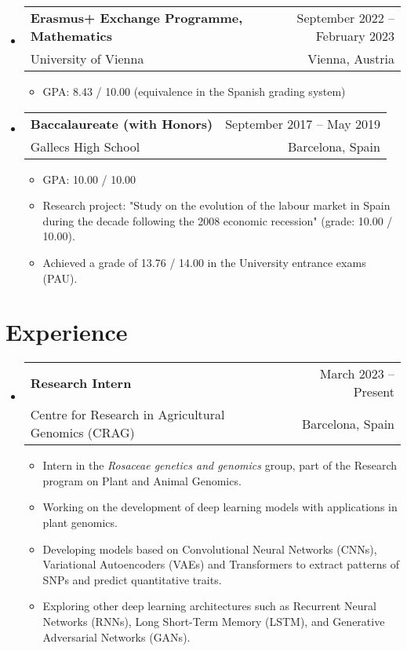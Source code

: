 \documentclass[a4paper,11pt]{article}
\makeatletter
\newcommand{\resumeQuadHeading}[4]{
  \item
  \begin{tabular*}{0.96\textwidth}[t]{l@{\extracolsep{\fill}}r}
    \textbf{#1} & \small #2 \\
    \small#3 & \small #4 \\
  \end{tabular*}
}
\newcommand{\resumeHeadingListStart}{
  \begin{itemize}[leftmargin=0.15in, label={}]
}
\newcommand{\resumeHeadingListEnd}{\end{itemize}}
\makeatother
\begin{document}
  \resumeHeadingListStart{}
    \resumeQuadHeading{Erasmus+ Exchange Programme, Mathematics}{September 2022 – February 2023}
    {University of Vienna}{Vienna, Austria}
    \begin{itemize}[leftmargin=3em, itemsep=0.1em, topsep=2pt]
        \item \small GPA: 8.43 / 10.00 (equivalence in the Spanish grading system)
    \end{itemize}
  \resumeHeadingListEnd{}
  
  \resumeHeadingListStart{}
    \resumeQuadHeading{Baccalaureate (with Honors)}{September 2017 – May 2019}
    {Gallecs High School}{Barcelona, Spain}
    \begin{itemize}[leftmargin=3em, itemsep=0.1em, topsep=2pt]
      \item \small GPA: 10.00 / 10.00
      \item \small Research project: "Study on the evolution of the labour market in Spain during the decade following the 2008 economic recession" (grade: 10.00 / 10.00).
      \item \small Achieved a grade of 13.76 / 14.00 in the University entrance exams (PAU).
    \end{itemize}
  \resumeHeadingListEnd{}


\section{Experience}
  \resumeHeadingListStart{}
    \resumeQuadHeading{Research Intern}{March 2023 – Present}
    {Centre for Research in Agricultural Genomics (CRAG)}{Barcelona, Spain}
    \begin{itemize}[leftmargin=3em, itemsep=0.1em, topsep=2pt]
      \item \small Intern in the \textit{Rosaceae genetics and genomics} group, part of the Research program on Plant and Animal Genomics.
      \item \small Working on the development of deep learning models with applications in plant genomics. 
      \item \small Developing models based on Convolutional Neural Networks (CNNs), Variational Autoencoders (VAEs) and Transformers to extract patterns of SNPs and predict quantitative traits. 
      \item \small Exploring other deep learning architectures such as Recurrent Neural Networks (RNNs), Long Short-Term Memory (LSTM), and Generative Adversarial Networks (GANs).
    \end{itemize}
  \resumeHeadingListEnd{}
\end{document}
